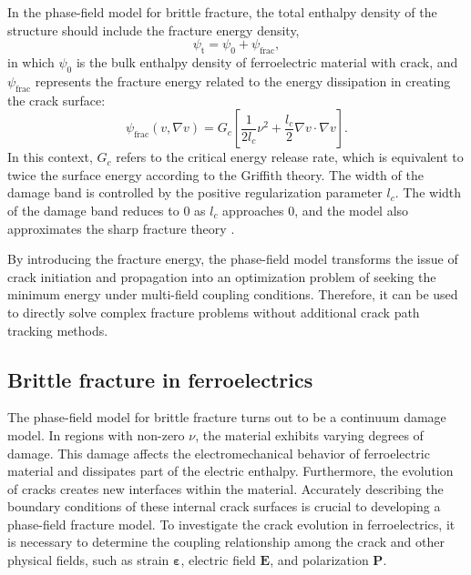 \documentclass[final,times,fleqn,11pt]{elsarticle}
\begin{document}
In the phase-field model for brittle fracture, the total enthalpy density of the structure should include the fracture energy density,
\begin{equation}
    \psi_{\mathrm{t}}=\psi_0+\psi_{\mathrm{frac}},
\end{equation}
in which $\psi_0$ is the bulk enthalpy density of ferroelectric material with crack, and $\psi_\mathrm{frac}$ represents the fracture energy related to the energy dissipation in creating the crack surface:
\begin{equation}\label{eq9}
    \psi_{\mathrm{frac}}(v,\nabla v)=G_c\left[\frac{1}{2l_c}\nu^2+\frac{l_c}{2}\nabla v\cdot \nabla v\right].
\end{equation}
In this context,  $G_c$ refers to the critical energy release rate, which is equivalent to twice the surface energy according to the Griffith theory. The width of the damage band is controlled by the positive regularization parameter $l_c$. The width of the damage band reduces to 0 as $l_c$ approaches 0, and the model also approximates the sharp fracture theory \cite{miehe_thermodynamically_2010}.

By introducing the fracture energy, the phase-field model transforms the issue of crack initiation and propagation  into an optimization problem of seeking the minimum energy under multi-field coupling conditions. Therefore, it can be used to directly solve complex fracture problems without additional crack path tracking methods.

\subsection{Brittle fracture in ferroelectrics}
The phase-field model for brittle fracture turns out to be a continuum damage model. In regions with non-zero $\nu$, the material exhibits varying degrees of damage. This damage affects the electromechanical behavior of ferroelectric material and dissipates part of the electric enthalpy. Furthermore, the evolution of cracks creates new interfaces within the material. Accurately describing the boundary conditions of these internal crack surfaces is crucial to developing a phase-field fracture model. To investigate the crack evolution in ferroelectrics, it is necessary to determine the coupling relationship among the crack and other physical fields, such as strain $\mathbf{\varepsilon}$, electric field $\mathbf{E}$, and polarization $\mathbf{P}$. 
\end{document}
